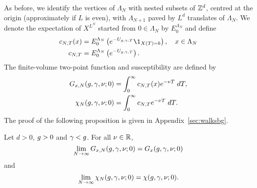As before, we identify the vertices of $\Lambda_N$ with nested subsets of ${ {{\mathbb Z}}^d }$,
centred at the origin (approximately if $L$ is even),
with $\Lambda_{N+1}$ paved by $L^d$ translates of $\Lambda_N$.
We denote the expectation of $X^{L^N}$ started from $0 \in \Lambda_N$ by $E^{\Lambda_N}_0$
and define
\begin{align}
\label{e:cN}
c_{N,T}(x)
    &= E^{\Lambda_N}_0 \left( e^{-U_{\gcc,\gamma,T}} \1_{X(T)=b} \right),
    \quad x \in \Lambda_N \\
c_{N,T}
    &= E^{\Lambda_N}_0 \left( e^{-U_{\gcc,\gamma,T}} \right).
\end{align}
The finite-volume two-point function and susceptibility
are defined by
\begin{align}
G_{x,N}(g,\gamma,\nu; 0)
    &=
\int_0^\infty c_{N,T}(x) e^{-\nu T} \; dT, \\
\label{e:chiNdef-pre}
\chi_N(g, \gamma, \nu; 0)
    &=
\int_0^\infty c_{N,T} e^{-\nu T} \; dT.
\end{align}
The proof of the following proposition is given in Appendix~\ref{sec:walksbg}.

\begin{prop}
\label{prop:finvol}
Let $d >0$, $g >0$ and $\gamma < g$. For all $\nu \in {\mathbb R}$,
\begin{equation}
\label{e:Givlc}
\lim_{N \rightarrow \infty}
G_{x,N}(g,\gamma,\nu; 0)
=
G_x(g,\gamma,\nu; 0)
\end{equation}
and
\begin{equation}
\label{e:chilim-pre}
\lim_{N\rightarrow\infty}\chi_N(g,\gamma,\nu; 0) =   \chi(g,\gamma,\nu; 0).
\end{equation}
\end{prop}
